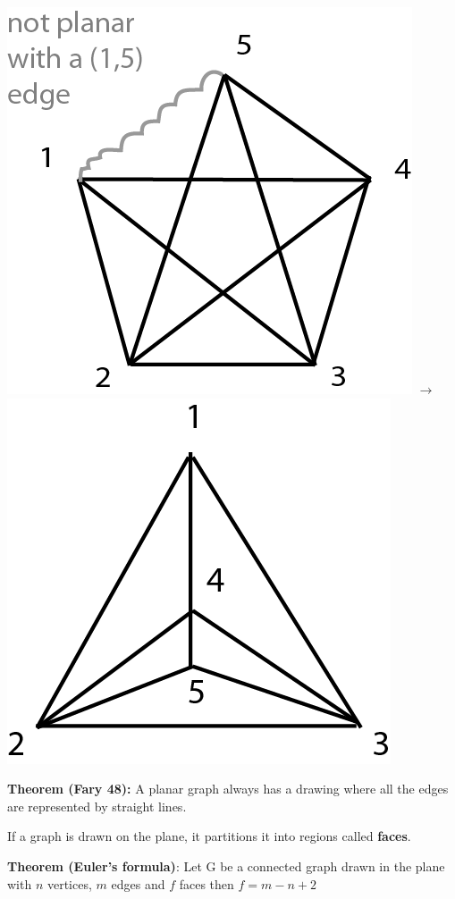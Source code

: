 \documentclass[9pt, letterpaper, oneside]{article}
\begin{document}
\includegraphics{fig10.png}
$\to$
\includegraphics{fig11.png}

\textbf{Theorem (Fary 48):} A planar graph always has a drawing where all the edges are represented by straight lines.

If a graph is drawn on the plane, it partitions it into regions called \textbf{faces}.

\textbf{Theorem (Euler's formula)}: Let G be a connected graph drawn in the plane with $n$ vertices, $m$ edges and $f$ faces then $f = m -n + 2$
\end{document}
